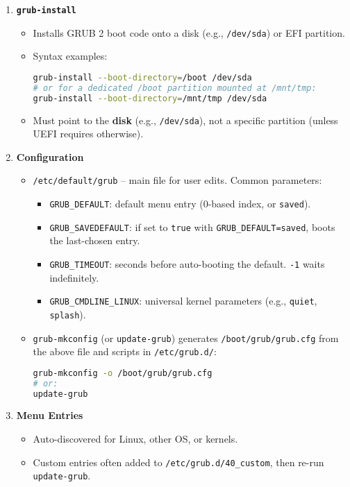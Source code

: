 \documentclass[12pt,a4paper]{report}
\begin{document}
\begin{enumerate}
    \item \textbf{\texttt{grub-install}}
    \begin{itemize}
        \item Installs GRUB 2 boot code onto a disk (e.g., \texttt{/dev/sda}) or EFI partition.
        \item Syntax examples:
        \begin{lstlisting}[language=bash]
grub-install --boot-directory=/boot /dev/sda
# or for a dedicated /boot partition mounted at /mnt/tmp:
grub-install --boot-directory=/mnt/tmp /dev/sda
        \end{lstlisting}
        \item Must point to the \textbf{disk} (e.g., \texttt{/dev/sda}), not a specific partition (unless UEFI requires otherwise).
    \end{itemize}

    \item \textbf{Configuration}
    \begin{itemize}
        \item \texttt{/etc/default/grub} – main file for user edits. Common parameters:
        \begin{itemize}
            \item \texttt{GRUB\_DEFAULT}: default menu entry (0-based index, or \texttt{saved}).
            \item \texttt{GRUB\_SAVEDEFAULT}: if set to \texttt{true} with \texttt{GRUB\_DEFAULT=saved}, boots the last-chosen entry.
            \item \texttt{GRUB\_TIMEOUT}: seconds before auto-booting the default. \texttt{-1} waits indefinitely.
            \item \texttt{GRUB\_CMDLINE\_LINUX}: universal kernel parameters (e.g., \texttt{quiet}, \texttt{splash}).
        \end{itemize}
        \item \texttt{grub-mkconfig} (or \texttt{update-grub}) generates \texttt{/boot/grub/grub.cfg} from the above file and scripts in \texttt{/etc/grub.d/}:
        \begin{lstlisting}[language=bash]
grub-mkconfig -o /boot/grub/grub.cfg
# or:
update-grub
        \end{lstlisting}
    \end{itemize}

    \item \textbf{Menu Entries}
    \begin{itemize}
        \item Auto-discovered for Linux, other OS, or kernels.
        \item Custom entries often added to \texttt{/etc/grub.d/40\_custom}, then re-run \texttt{update-grub}.
    \end{itemize}


\end{enumerate}
\end{document}
